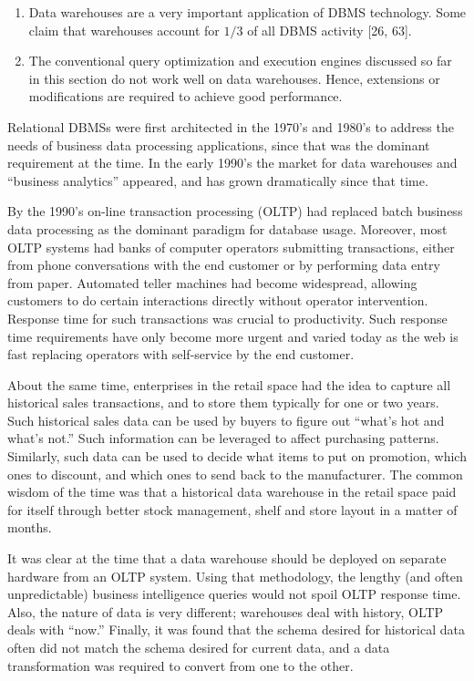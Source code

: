 \documentclass[a4paper,11pt,twoside,openright]{book}
\begin{document}
\begin{enumerate}
\def\labelenumi{\arabic{enumi}.}
\item
  Data warehouses are a very important application of DBMS technology.
  Some claim that warehouses account for $1/3$ of all DBMS activity {[}26,
  63{]}.
\item
  The conventional query optimization and execution engines discussed so
  far in this section do not work well on data warehouses. Hence,
  extensions or modifications are required to achieve good performance.
\end{enumerate}

Relational DBMSs were first architected in the 1970's and 1980's to
address the needs of business data processing applications, since that
was the dominant requirement at the time. In the early 1990's the market
for data warehouses and ``business analytics'' appeared, and has grown
dramatically since that time.

By the 1990's on-line transaction processing (OLTP) had replaced batch
business data processing as the dominant paradigm for database usage.
Moreover, most OLTP systems had banks of computer operators submitting
transactions, either from phone conversations with the end customer or
by performing data entry from paper. Automated teller machines had
become widespread, allowing customers to do certain interactions
directly without operator intervention. Response time for such
transactions was crucial to productivity. Such response time
requirements have only become more urgent and varied today as the web is
fast replacing operators with self-service by the end customer.

About the same time, enterprises in the retail space had the idea to
capture all historical sales transactions, and to store them typically
for one or two years. Such historical sales data can be used by buyers
to figure out ``what's hot and what's not.'' Such information can be
leveraged to affect purchasing patterns. Similarly, such data can be
used to decide what items to put on promotion, which ones to discount,
and which ones to send back to the manufacturer. The common wisdom of
the time was that a historical data warehouse in the retail space paid
for itself through better stock management, shelf and store layout in a
matter of months.

It was clear at the time that a data warehouse should be deployed on
separate hardware from an OLTP system. Using that methodology, the
lengthy (and often unpredictable) business intelligence queries would
not spoil OLTP response time. Also, the nature of data is very
different; warehouses deal with history, OLTP deals with ``now.''
Finally, it was found that the schema desired for historical data often
did not match the schema desired for current data, and a data
transformation was required to convert from one to the other.
\end{document}
